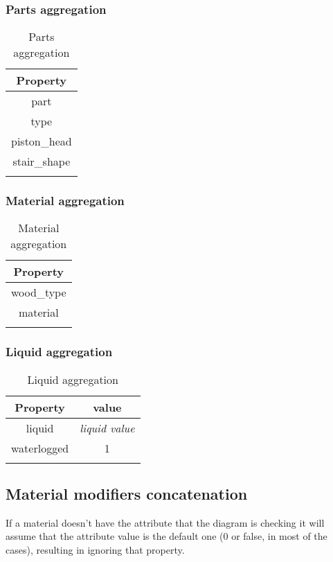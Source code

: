 \subsubsection{Parts aggregation}\label{spigot-types:parts}

\begin{longtable}{ |c| }
\hline
Property \\
\hline
\endhead
part \\
type \\
piston\_head \\
stair\_shape \\
\hline
\caption{Parts aggregation}
\end{longtable}

\subsubsection{Material aggregation}\label{spigot-types:material}

\begin{longtable}{ |c| }
\hline
Property \\
\hline
\endhead
wood\_type \\
material \\
\hline
\caption{Material aggregation}
\end{longtable}

\subsubsection{Liquid aggregation}\label{spigot-types:liquid}

\begin{longtable}{ |c|c| }
\hline
Property & value \\
\hline
\endhead
liquid & \textit{liquid value} \\
waterlogged & 1\footnotemark \\
\hline
\caption{Liquid aggregation}
\end{longtable}


\subsection{Material modifiers concatenation}

If a material doesn't have the attribute that the diagram is checking it will assume that the attribute value is the default one (0 or false, in most of the cases), resulting in ignoring that property.

